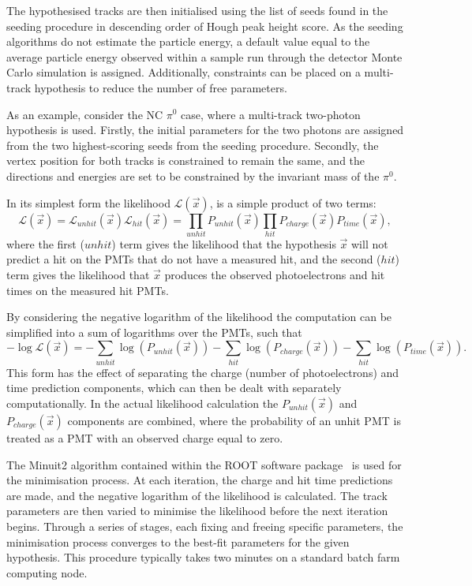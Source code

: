 The hypothesised tracks are then initialised using the list of seeds found in the seeding
procedure in descending order of Hough peak height score. As the seeding algorithms do not
estimate the particle energy, a default value equal to the average particle energy observed within
a sample run through the detector Monte Carlo simulation is assigned. Additionally, constraints
can be placed on a multi-track hypothesis to reduce the number of free parameters.

As an example, consider the NC $\pi^{0}$ case, where a multi-track two-photon hypothesis is used.
Firstly, the initial parameters for the two photons are assigned from the two highest-scoring
seeds from the seeding procedure. Secondly, the vertex position for both tracks is constrained to
remain the same, and the directions and energies are set to be constrained by the invariant mass
of the $\pi^{0}$.

In its simplest form the likelihood $\mathcal{L}(\vec{x})$, is a simple product of two terms:
\begin{equation} %
    \mathcal{L}(\vec{x})=\mathcal{L}_{unhit}(\vec{x})\mathcal{L}_{hit}(\vec{x})=
    \prod_{unhit}P_{unhit}(\vec{x})\prod_{hit}P_{charge}(\vec{x})P_{time}(\vec{x}),
    \label{eq:likelihood}
\end{equation}
where the first ($unhit$) term gives the likelihood that the hypothesis $\vec{x}$ will not predict
a hit on the PMTs that do not have a measured hit, and the second ($hit$) term gives the
likelihood that $\vec{x}$ produces the observed photoelectrons and hit times on the measured hit
PMTs. 

By considering the negative logarithm of the likelihood the computation can be simplified into a
sum of logarithms over the PMTs, such that
\begin{equation} %
    -\log\mathcal{L}(\vec{x})=
    -\sum_{unhit}\log(P_{unhit}(\vec{x}))
    -\sum_{hit}\log(P_{charge}(\vec{x}))
    -\sum_{hit}\log(P_{time}(\vec{x})).
    \label{eq:likelihood_sum}
\end{equation}
This form has the effect of separating the charge (number of photoelectrons) and time prediction
components, which can then be dealt with separately computationally. In the actual likelihood
calculation the $P_{unhit}(\vec{x})$ and $P_{charge}(\vec{x})$ components are combined, where the
probability of an unhit PMT is treated as a PMT with an observed charge equal to zero.

The Minuit2 algorithm contained within the ROOT software package~\cite{brun1997} is used for the
minimisation process. At each iteration, the charge and hit time predictions are made, and the
negative logarithm of the likelihood is calculated. The track parameters are then varied to
minimise the likelihood before the next iteration begins. Through a series of stages, each fixing
and freeing specific parameters, the minimisation process converges to the best-fit parameters for
the given hypothesis. This procedure typically takes two minutes on a standard batch farm
computing node.

